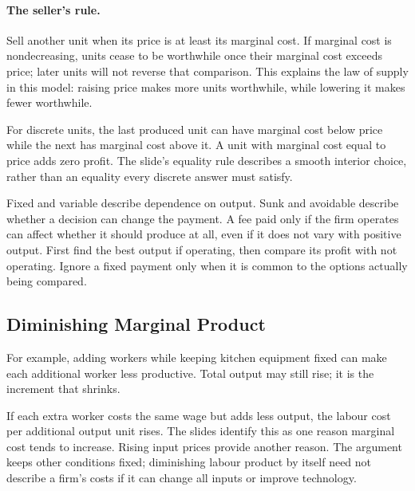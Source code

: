 \paragraph{The seller's rule.}
Sell another unit when its price is at least its marginal cost. If marginal
cost is nondecreasing, units cease to be worthwhile once their marginal
cost exceeds price; later units will not reverse that comparison.
This explains the law of supply in this model: raising price makes more
units worthwhile, while lowering it makes fewer worthwhile.

For discrete units, the last produced unit can have marginal cost below
price while the next has marginal cost above it. A unit with marginal
cost equal to price adds zero profit. The slide's equality rule describes
a smooth interior choice, rather than an equality every discrete answer
must satisfy.

\begin{remark}
Fixed and variable describe dependence on output. Sunk and avoidable
describe whether a decision can change the payment. A fee paid only if the firm
operates can affect whether it should produce at all, even if it does not
vary with positive output. First find the best output if operating, then
compare its profit with not operating. Ignore a fixed payment only when
it is common to the options actually being compared.
\end{remark}

\subsection{Diminishing Marginal Product}
For example, adding workers while keeping kitchen equipment fixed can
make each additional worker less productive. Total output may still rise;
it is the increment that shrinks.

If each extra worker costs the same wage but adds less output, the labour
cost per additional output unit rises. The slides identify this as one
reason marginal cost tends to increase. Rising input prices provide another
reason. The argument keeps other conditions fixed; diminishing labour
product by itself need not describe a firm's costs if it can change all
inputs or improve technology.

